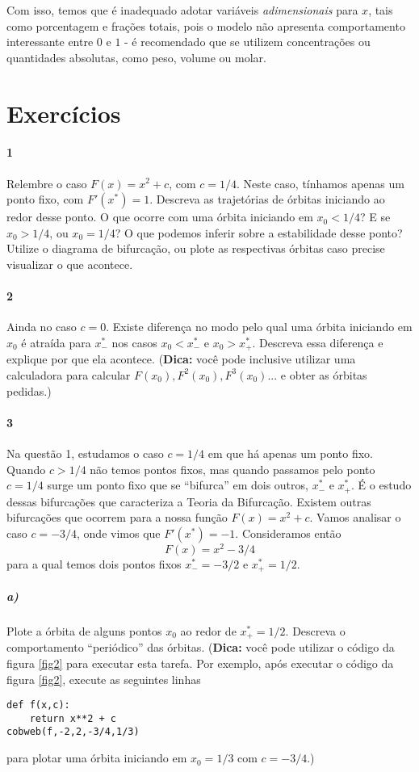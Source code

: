 \documentclass{article}
\begin{document}
Com isso, temos que é inadequado adotar variáveis \emph{adimensionais} para $x$, tais como porcentagem e frações totais, pois o modelo não apresenta comportamento interessante entre $0$ e $1$ - é recomendado que se utilizem concentrações ou quantidades absolutas, como peso, volume ou molar. 

\section*{Exercícios}
\paragraph{1} Relembre o caso $F(x) = x^2 + c$, com $c = 1/4$. Neste caso, tínhamos apenas um ponto fixo, com $F'(x^*) = 1$. Descreva as trajetórias de órbitas iniciando ao redor desse ponto. O que ocorre com uma órbita iniciando em $x_0  < 1/4$? E se $x_0 > 1/4$, ou $x_0 = 1/4$? O que podemos inferir sobre a estabilidade desse ponto? Utilize o diagrama de bifurcação, ou plote as respectivas órbitas caso precise visualizar o que acontece.

\paragraph{2} Ainda no caso $c = 0$. Existe diferença no modo pelo qual uma órbita iniciando em $x_0$ é atraída para $x^*_-$ nos casos $x_0 < x^*_-$ e $x_0 > x^*_+$. Descreva essa diferença e explique por que ela acontece. (\textbf{Dica:} você pode inclusive utilizar uma calculadora para calcular $F(x_0), F^2(x_0), F^3(x_0)...$ e obter as órbitas pedidas.)

\paragraph{3} Na questão 1, estudamos o caso $c = 1/4$ em que há apenas um ponto fixo. Quando $c > 1/4$ não temos pontos fixos, mas quando passamos pelo ponto $c = 1/4$ surge um ponto fixo que se ``bifurca'' em dois outros, $x^*_-$ e $x^*_+$. É o estudo dessas bifurcações que caracteriza a Teoria da Bifurcação. Existem outras bifurcações que ocorrem para a nossa função $F(x) = x^2 + c$. Vamos analisar o caso $c = -3/4$, onde vimos que $F'(x^*) = -1$. Consideramos então 
\begin{equation}
F(x) = x^2 - 3/4
\label{eq34}
\end{equation}
para a qual temos dois pontos fixos $x^*_- = -3/2 \textrm{ e } x^*_+ = 1/2$.
\subparagraph{a)} Plote a órbita de alguns pontos $x_0$ ao redor de $x^*_+ = 1/2$. Descreva o comportamento ``periódico'' das órbitas. (\textbf{Dica:} você pode utilizar o código da figura \ref{fig2} para executar esta tarefa. Por exemplo, após executar o código da figura \ref{fig2}, execute as seguintes linhas
\begin{verbatim}
def f(x,c):
    return x**2 + c
cobweb(f,-2,2,-3/4,1/3)
\end{verbatim}
para plotar uma órbita iniciando em $x_0 = 1/3$ com $c = -3/4$.)
\end{document}
